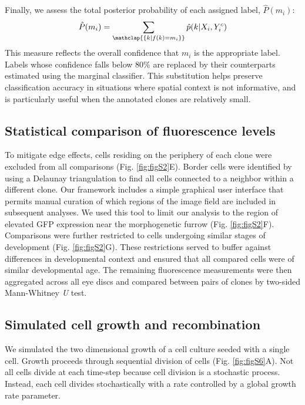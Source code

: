Finally, we assess the total posterior probability of each assigned label, $\hat{P}(m_i)$:
\begin{equation}
\hat{P}(m_i) = \sum_{ \mathclap{ \{ k | f(k)=m_i \}} } \hat{p}(k | X_i,Y^c_i)
\end{equation}
This measure reflects the overall confidence that $m_i$ is the appropriate label. Labels whose confidence falls below 80\% are replaced by their counterparts estimated using the marginal classifier. This substitution helps preserve classification accuracy in situations where spatial context is not informative, and is particularly useful when the annotated clones are relatively small.

\subsection{Statistical comparison of fluorescence levels}

To mitigate edge effects, cells residing on the periphery of each clone were excluded from all comparisons (Fig. \ref{fig:figS2}E). Border cells were identified by using a Delaunay triangulation to find all cells connected to a neighbor within a different clone. Our framework includes a simple graphical user interface that permits manual curation of which regions of the image field are included in subsequent analyses. We used this tool to limit our analysis to the region of elevated GFP expression near the morphogenetic furrow (Fig. \ref{fig:figS2}F). Comparisons were further restricted to cells undergoing similar stages of development (Fig. \ref{fig:figS2}G). These restrictions served to buffer against differences in developmental context and ensured that all compared cells were of similar developmental age. The remaining fluorescence measurements were then aggregated across all eye discs and compared between pairs of clones by two-sided Mann-Whitney \textit{U} test.

\subsection{Simulated cell growth and recombination}

We simulated the two dimensional growth of a cell culture seeded with a single cell. Growth proceeds through sequential division of cells (Fig. \ref{fig:figS6}A). Not all cells divide at each time-step because cell division is a stochastic process. Instead, each cell divides stochastically with a rate controlled by a global growth rate parameter.

